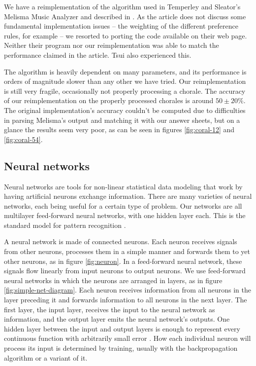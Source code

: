 \documentclass{article}
\begin{document}
We have a reimplementation of the algorithm used in Temperley and
Sleator's Melisma Music Analyzer and described in
\cite{temperley.ea:modeling}. As the article does not discuss some
fundamental implementation issues -- the weighting of the different
preference rules, for example -- we resorted to porting the code
available on their web page. Neither their program nor our
reimplementation was able to match the performance claimed in the
article. Tsui \cite{tsui:harmonic} also experienced this.

The algorithm is heavily dependent on many parameters, and its
performance is orders of magnitude slower than any other we have
tried. Our reimplementation is still very fragile, occasionally not
properly processing a chorale. The accuracy of our reimplementation on
the properly processed chorales is around $50 \pm 20\%$. The original
implementation's accuracy couldn't be computed due to difficulties in
parsing Melisma's output and matching it with our answer sheets, but on
a glance the results seem very poor, as can be seen in figures
\ref{fig:coral-12} and \ref{fig:coral-54}.

\subsection{Neural networks}
\label{sec:neural-nets}

Neural networks are tools for non-linear statistical data
modeling that work by having artificial neurons exchange
information. There are many varieties of neural networks, each being
useful for a certain type of problem. Our networks are all multilayer
feed-forward neural networks, with one hidden layer each. This is the
standard model for pattern recognition \cite{russell.ea:artificial}.

A neural network is made of connected neurons. Each neuron receives
signals from other neurons, processes them in a simple manner and
forwards them to yet other neurons, as in figure \ref{fig:neuron}. In
a feed-forward neural network, these signals flow linearly from input
neurons to output neurons. We use feed-forward neural networks in which
the neurons are arranged in layers, as in figure
\ref{fig:simple-net-diagram}. Each neuron receives information from
all neurons in the layer preceding it and forwards information to all
neurons in the next layer. The first layer, the input layer, receives
the input to the neural network as information, and the output layer
emits the neural network's outputs. One hidden layer between the input
and output layers is enough to represent every continuous function
with arbitrarily small error \cite{russell.ea:artificial}. How each
individual neuron will process its input is determined by training,
usually with the backpropagation algorithm or a variant of it.
\end{document}

